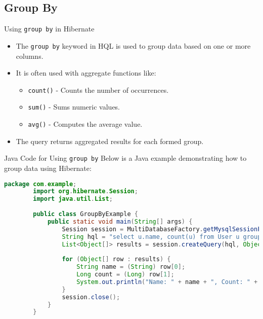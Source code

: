 \documentclass[aspectratio=169, table]{beamer}
\begin{document}
\subsection{Group By}

\begin{frame}{Using \texttt{group by} in Hibernate}
	\vspace{20pt}
	\begin{itemize}
		\item The \texttt{group by} keyword in HQL is used to group data based on one or more columns.
		\item It is often used with aggregate functions like:
		\begin{itemize}
			\item \texttt{count()} - Counts the number of occurrences.
			\item \texttt{sum()} - Sums numeric values.
			\item \texttt{avg()} - Computes the average value.
		\end{itemize}
		\item The query returns aggregated results for each formed group.
	\end{itemize}
\end{frame}

\begin{frame}[fragile]{Java Code for Using \texttt{group by}}
	\vspace{20pt}
	Below is a Java example demonstrating how to group data using Hibernate:
	
	\begin{lstlisting}[language=Java, style=JavaStyle]
		package com.example;
		import org.hibernate.Session;
		import java.util.List;
		
		public class GroupByExample {
			public static void main(String[] args) {
				Session session = MultiDatabaseFactory.getMysqlSessionFactory().openSession();
				String hql = "select u.name, count(u) from User u group by u.name";
				List<Object[]> results = session.createQuery(hql, Object[].class).list();
				
				for (Object[] row : results) {
					String name = (String) row[0];
					Long count = (Long) row[1];
					System.out.println("Name: " + name + ", Count: " + count);
				}
				session.close();
			}
		}
	\end{lstlisting}
\end{frame}
\end{document}
